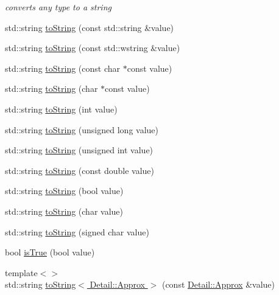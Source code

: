 \begin{DoxyCompactItemize}
\begin{DoxyCompactList}\small\item\em converts any type to a string \end{DoxyCompactList}\item 
std\-::string \hyperlink{namespaceCatch_a563c0f6b712db1093dc19f0cbf95e93c}{to\-String} (const std\-::string \&value)
\item 
std\-::string \hyperlink{namespaceCatch_a7511f0603a71ce84fe2517b252e91d3d}{to\-String} (const std\-::wstring \&value)
\item 
std\-::string \hyperlink{namespaceCatch_ace2e2fe33b196bc8278f605dcb72e38d}{to\-String} (const char $\ast$const value)
\item 
std\-::string \hyperlink{namespaceCatch_ae6c2bc95517444d8df8199bd3f61609b}{to\-String} (char $\ast$const value)
\item 
std\-::string \hyperlink{namespaceCatch_acee54d0580385e4347bc42a7d22bc893}{to\-String} (int value)
\item 
std\-::string \hyperlink{namespaceCatch_aba1d78bce62f8c73cbfc2a14225356ea}{to\-String} (unsigned long value)
\item 
std\-::string \hyperlink{namespaceCatch_a6fd78030f740c1c3bdc60efdfd5fc85d}{to\-String} (unsigned int value)
\item 
std\-::string \hyperlink{namespaceCatch_a3eb4356d09b7ef3286f6c1c1efe8cabf}{to\-String} (const double value)
\item 
std\-::string \hyperlink{namespaceCatch_a5d3bdb2ec0e6f415e2a1a0e4914d7d3a}{to\-String} (bool value)
\item 
std\-::string \hyperlink{namespaceCatch_a25a0a78cbb62ea08b5d49e443051c387}{to\-String} (char value)
\item 
std\-::string \hyperlink{namespaceCatch_a0a5d9d0965d0d2a0663773732283713e}{to\-String} (signed char value)
\item 
bool \hyperlink{namespaceCatch_ae3bc6c6677e64e6eaa720dc3add31852}{is\-True} (bool value)
\item 
{\footnotesize template$<$$>$ }\\std\-::string \hyperlink{namespaceCatch_ac57d4a3df71159aaba05899576211d5f}{to\-String$<$ Detail\-::\-Approx $>$} (const \hyperlink{classCatch_1_1Detail_1_1Approx}{Detail\-::\-Approx} \&value)
\end{DoxyCompactItemize}


